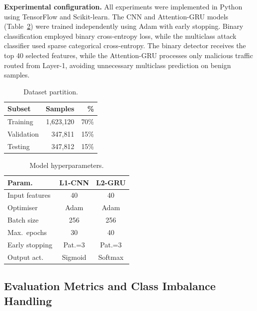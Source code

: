 \documentclass{llncs}
\begin{document}
\textbf{Experimental configuration.} All experiments were implemented in Python using TensorFlow and Scikit-learn. The CNN and Attention-GRU models (Table~\ref{tab:hyperparams}) were trained independently using Adam with early stopping. Binary classification employed binary cross-entropy loss, while the multiclass attack classifier used sparse categorical cross-entropy. The binary detector receives the top 40 selected features, while the Attention-GRU processes only malicious traffic routed from Layer-1, avoiding unnecessary multiclass prediction on benign samples.

\begin{table}[!htb]
\centering
\caption{Dataset partition.}
\label{tab:split}
\small
\begin{tabular}{lrr}
\toprule
\textbf{Subset} & \textbf{Samples} & \textbf{\%} \\
\midrule
Training   & 1{,}623{,}120 & 70\% \\
Validation & 347{,}811     & 15\% \\
Testing    & 347{,}812     & 15\% \\
\bottomrule
\end{tabular}
\end{table}

\begin{table}[!htb]
\centering
\caption{Model hyperparameters.}
\label{tab:hyperparams}
\small
\begin{tabular}{lcc}
\toprule
\textbf{Param.} & \textbf{L1-CNN} & \textbf{L2-GRU} \\
\midrule
Input features    & 40      & 40 \\
Optimiser         & Adam    & Adam \\
Batch size        & 256     & 256 \\
Max.\ epochs      & 30      & 40 \\
Early stopping    & Pat.=3  & Pat.=3 \\
Output act.       & Sigmoid & Softmax \\
\bottomrule
\end{tabular}
\end{table}

\subsection{Evaluation Metrics and Class Imbalance Handling}
\end{document}
